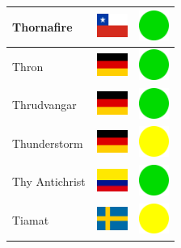 \documentclass[12pt, a4paper, twoside]{report}
\begin{document}
\begin{center}
\begin{longtable}{|p{5cm}|p{2cm}|p{2cm}|}
 Thornafire                                                 & \includegraphics[width=1cm]{../4x3/cl} &   \includegraphics[width=1cm]{../likes/y} \\ \hline
 Thron                                                      & \includegraphics[width=1cm]{../4x3/de} &   \includegraphics[width=1cm]{../likes/y} \\ \hline
 Thrudvangar                                                & \includegraphics[width=1cm]{../4x3/de} &   \includegraphics[width=1cm]{../likes/y} \\ \hline
 Thunderstorm                                               & \includegraphics[width=1cm]{../4x3/de} &   \includegraphics[width=1cm]{../likes/m} \\ \hline
 Thy Antichrist                                             & \includegraphics[width=1cm]{../4x3/co} &   \includegraphics[width=1cm]{../likes/y} \\ \hline
 Tiamat                                                     & \includegraphics[width=1cm]{../4x3/se} &   \includegraphics[width=1cm]{../likes/m} \\ \hline

\end{longtable}
\end{center}
\end{document}
